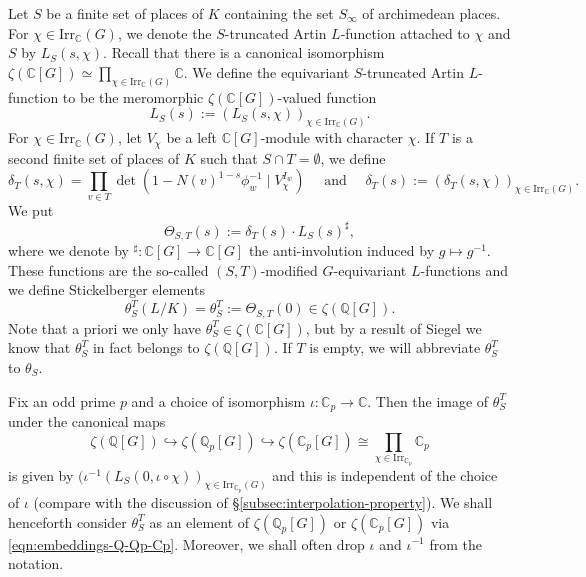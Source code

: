 \documentclass[12pt]{amsart}
\theoremstyle{plain}
\theoremstyle{remark}
\theoremstyle{definition}
\numberwithin{equation}{section}
\begin{document}
{Let $S$ be a finite set of places of $K$ containing the set $S_{\infty}$ of archimedean places.
For $\chi \in {\mathrm{Irr}}_{\mathbb{C}}(G)$, we denote the $S$-truncated Artin $L$-function attached to $\chi$ and $S$ by $L_{S}(s,\chi)$.
Recall that there is a canonical isomorphism
$\zeta({\mathbb{C}}[G]) \simeq \prod_{\chi \in {\mathrm{Irr}}_{\mathbb{C}} (G)} {\mathbb{C}}$.
We define the equivariant $S$-truncated Artin $L$-function to be the meromorphic $\zeta({\mathbb{C}}[G])$-valued function
\[
L_{S}(s) := (L_{S}(s,\chi))_{\chi \in {\mathrm{Irr}}_{\mathbb{C}} (G)}.
\]
For $\chi \in {\mathrm{Irr}}_{\mathbb{C}}(G)$, let $V_{\chi}$ be a left ${\mathbb{C}}[G]$-module with character $\chi$.
If $T$ is a second finite set of places of $K$ such that $S \cap T = \emptyset$, we define
\[
\delta_{T}(s,\chi) = \prod_{v \in T} \det(1 - N(v)^{1-s} \phi_{w}^{-1} \mid V_{\chi}^{I_{w}}) \quad  \textrm{ and }  \quad
\delta_{T}(s) := (\delta_{T}(s,\chi))_{\chi\in {\mathrm{Irr}}_{\mathbb{C}} (G)}.
\]
We put
\[
\Theta_{S,T}(s) := \delta_{T}(s) \cdot L_{S}(s)^{\sharp},
\]
where we denote by $^{\sharp}: {\mathbb{C}}[G] \to {\mathbb{C}}[G]$ the anti-involution induced by $g \mapsto g^{-1}$.
These functions are the so-called $(S,T)$-modified $G$-equivariant $L$-functions and we define Stickelberger elements
\[
\theta_{S}^{T}(L/K) = \theta_{S}^{T} := \Theta_{S,T}(0) \in \zeta({\mathbb{Q}}[G]).
\]
Note that a priori we only have $\theta_{S}^{T} \in \zeta({\mathbb{C}}[G])$, but by a result of Siegel \cite{MR0285488} we know that $\theta_{S}^{T}$
in fact belongs to $\zeta({\mathbb{Q}}[G])$.
If $T$ is empty, we will abbreviate $\theta_{S}^{T}$ to $\theta_{S}$.

Fix an odd prime $p$ and a choice of isomorphism $\iota : {\mathbb{C}}_{p} \rightarrow {\mathbb{C}}$.
Then the image of $\theta_{S}^{T}$ under the canonical maps 
\begin{equation}\label{eqn:embeddings-Q-Qp-Cp}
\zeta({\mathbb{Q}}[G]) \hookrightarrow \zeta({\mathbb{Q}}_{p}[G]) \hookrightarrow \zeta({\mathbb{C}}_{p}[G]) \cong \textstyle{\prod_{\chi \in {\mathrm{Irr}}_{{\mathbb{C}}_{p}}}} {\mathbb{C}}_{p} 
\end{equation}
is given by $(\iota^{-1}(L_{S}(0,\iota \circ \chi))_{\chi \in {\mathrm{Irr}}_{{\mathbb{C}}_{p}}(G)}$ and this is independent of the choice of $\iota$ (compare with the discussion of \S \ref{subsec:interpolation-property}).
We shall henceforth consider $\theta_{S}^{T}$ as an element of $\zeta({\mathbb{Q}}_{p}[G])$ or $\zeta({\mathbb{C}}_{p}[G])$ via \eqref{eqn:embeddings-Q-Qp-Cp}.
Moreover, we shall often drop $\iota$ and $\iota^{-1}$ from the notation.
 
}
\end{document}
